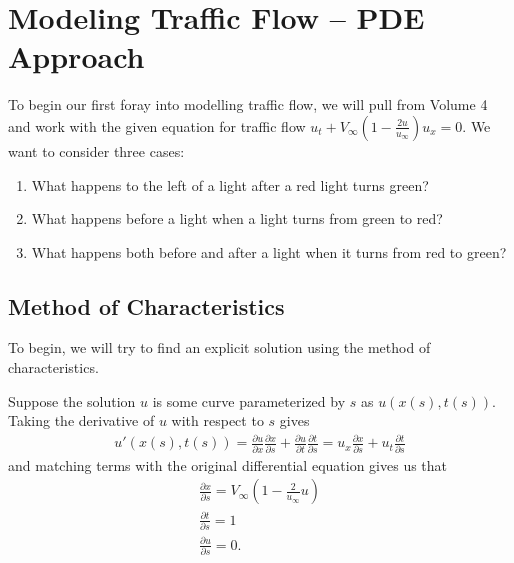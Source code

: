 \documentclass[12pt]{article}
\begin{document}
    
    \section{Modeling Traffic Flow – PDE Approach}
    
    To begin our first foray into modelling traffic flow, we will pull from Volume 4 and work with the given equation for traffic flow $u_t + V_\infty \left(1 - \frac{2u}{u_{\infty}} \right) u_x = 0$. We want to consider three cases:
    \begin{enumerate}
        \item What happens to the left of a light after a red light turns green?
        \item What happens before a light when a light turns from green to red? 
        \item What happens both before and after a light when it turns from red to green?
    \end{enumerate}
    
    \subsection{Method of Characteristics} 
    To begin, we will try to find an explicit solution using the method of characteristics. 
    
    Suppose the solution $u$ is some curve parameterized by $s$ as $u(x(s), t(s))$. Taking the derivative of $u$ with respect to $s$ gives 
    \begin{align*} %
        u'(x(s), t(s)) = \frac{\partial u}{\partial x} \frac{\partial x}{\partial s}  + \frac{\partial u}{\partial t} \frac{\partial t}{\partial s} = u_x \frac{\partial x}{\partial s}  + u_t \frac{\partial t}{\partial s}
    \end{align*}
    and matching terms with the original differential equation gives us that 
    \begin{align*}
        \frac{\partial x}{\partial s}  = V_\infty \left( 1 - \frac{2}{u_\infty} u \right) \\
        \frac{\partial t}{\partial s} = 1 \\
        \frac{\partial u}{\partial s} = 0 .
    \end{align*}
    
\end{document}
